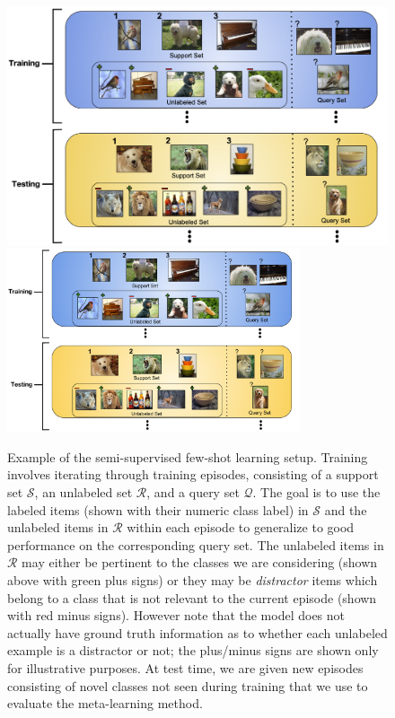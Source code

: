 \begin{figure}[ht]
    \centering
\iflatexml
    \includegraphics[width=6\textwidth]{figures/episode_setup.png}
\else
    \includegraphics[width=0.77\textwidth]{figures/episode_setup.pdf}
\fi
    \caption{Example of the semi-supervised few-shot learning setup. Training involves iterating through training episodes, consisting of a support set $\mathcal{S}$, an unlabeled set $\mathcal{R}$, and a query set $\mathcal{Q}$. The goal is to use the labeled items (shown with their numeric class label) in $\mathcal{S}$ and the unlabeled items in $\mathcal{R}$ within each episode to generalize to good performance on the corresponding query set. The unlabeled items in $\mathcal{R}$ may either be pertinent to the classes we are considering (shown above with green plus signs) or they may be \emph{distractor} items which belong to a class that is not relevant to the current episode (shown with red minus signs). However note that the model does not actually have ground truth information as to whether each unlabeled example is a distractor or not; the plus/minus signs are shown only for illustrative purposes. At test time, we are given new episodes consisting of novel classes not seen during training that we use to evaluate the meta-learning method.}
    \label{fig:episode_setup}
\end{figure}